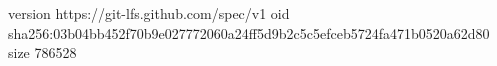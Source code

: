 version https://git-lfs.github.com/spec/v1
oid sha256:03b04bb452f70b9e027772060a24ff5d9b2c5c5efceb5724fa471b0520a62d80
size 786528
